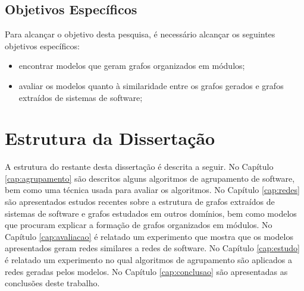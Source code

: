 \subsection{Objetivos Específicos}

Para alcançar o objetivo desta pesquisa, é necessário alcançar os seguintes objetivos específicos:

\begin{itemize}
	\item encontrar modelos que geram grafos organizados em módulos;
	\item avaliar os modelos quanto à similaridade entre os grafos gerados e grafos extraídos de sistemas de software;
\end{itemize}

\section{Estrutura da Dissertação}

A estrutura do restante desta dissertação é descrita a seguir. 
%
No Capítulo \ref{cap:agrupamento} são descritos alguns algoritmos de agrupamento de software, bem como uma técnica usada para avaliar os algoritmos.
%
No Capítulo \ref{cap:redes} são apresentados estudos recentes sobre a estrutura de grafos extraídos de sistemas de software e grafos estudados em outros domínios, bem como modelos que procuram explicar a formação de grafos organizados em módulos.
%
No Capítulo \ref{cap:avaliacao} é relatado um experimento que mostra que os modelos apresentados geram redes similares a redes de software.
%
No Capítulo \ref{cap:estudo} é relatado um experimento no qual algoritmos de agrupamento são aplicados a redes geradas pelos modelos.
%
No Capítulo \ref{cap:conclusao} são apresentadas as conclusões deste trabalho. 


